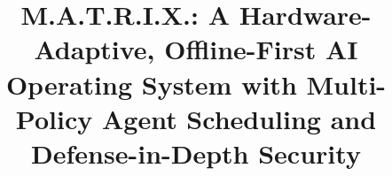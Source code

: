 \documentclass[conference]{IEEEtran}
\begin{document}

\title{M.A.T.R.I.X.: A Hardware-Adaptive, Offline-First AI Operating System with Multi-Policy Agent Scheduling and Defense-in-Depth Security}

\author{
}

\maketitle

\end{document}
